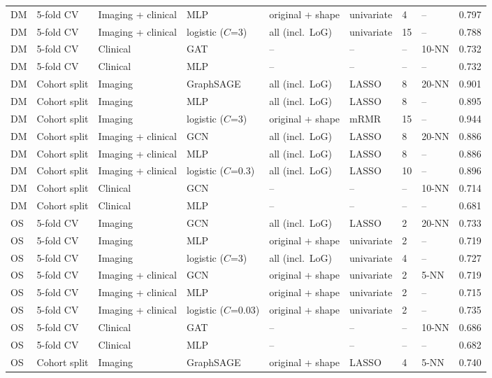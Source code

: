 \begin{tabular}{@{}lllllllll@{}}
DM & 5-fold CV & Imaging + clinical & MLP & original + shape & univariate & 4 & -- & 0.797 \\
DM & 5-fold CV & Imaging + clinical & logistic ($C$=3) & all (incl.\ LoG) & univariate & 15 & -- & 0.788 \\
DM & 5-fold CV & Clinical & GAT & -- & -- & -- & 10-NN & 0.732 \\
DM & 5-fold CV & Clinical & MLP & -- & -- & -- & -- & 0.732 \\
DM & Cohort split & Imaging & GraphSAGE & all (incl.\ LoG) & LASSO & 8 & 20-NN & 0.901 \\
DM & Cohort split & Imaging & MLP & all (incl.\ LoG) & LASSO & 8 & -- & 0.895 \\
DM & Cohort split & Imaging & logistic ($C$=3) & original + shape & mRMR & 15 & -- & 0.944 \\
DM & Cohort split & Imaging + clinical & GCN & all (incl.\ LoG) & LASSO & 8 & 20-NN & 0.886 \\
DM & Cohort split & Imaging + clinical & MLP & all (incl.\ LoG) & LASSO & 8 & -- & 0.886 \\
DM & Cohort split & Imaging + clinical & logistic ($C$=0.3) & all (incl.\ LoG) & LASSO & 10 & -- & 0.896 \\
DM & Cohort split & Clinical & GCN & -- & -- & -- & 10-NN & 0.714 \\
DM & Cohort split & Clinical & MLP & -- & -- & -- & -- & 0.681 \\
\midrule
OS & 5-fold CV & Imaging & GCN & all (incl.\ LoG) & LASSO & 2 & 20-NN & 0.733 \\
OS & 5-fold CV & Imaging & MLP & original + shape & univariate & 2 & -- & 0.719 \\
OS & 5-fold CV & Imaging & logistic ($C$=3) & all (incl.\ LoG) & univariate & 4 & -- & 0.727 \\
OS & 5-fold CV & Imaging + clinical & GCN & original + shape & univariate & 2 & 5-NN & 0.719 \\
OS & 5-fold CV & Imaging + clinical & MLP & original + shape & univariate & 2 & -- & 0.715 \\
OS & 5-fold CV & Imaging + clinical & logistic ($C$=0.03) & original + shape & univariate & 2 & -- & 0.735 \\
OS & 5-fold CV & Clinical & GAT & -- & -- & -- & 10-NN & 0.686 \\
OS & 5-fold CV & Clinical & MLP & -- & -- & -- & -- & 0.682 \\
OS & Cohort split & Imaging & GraphSAGE & original + shape & LASSO & 4 & 5-NN & 0.740 \\

\end{tabular}
